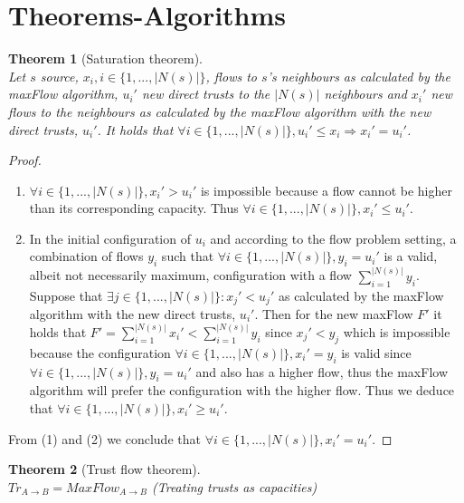 \documentclass[11pt]{article}
\newtheorem{theorem}{Theorem}[section]
\theoremstyle{definition}
\theoremstyle{corollary}
\begin{document}
  \section{Theorems-Algorithms}
    \begin{theorem}[Saturation theorem] \ \\ 
    \label{saturation}
       Let $s$ source, $x_i, i \in \{1,...,|N(s)|\}$, flows to $s$'s neighbours as calculated by the maxFlow algorithm,
       $u_i'$ new direct trusts to the $|N(s)|$ neighbours and $x_i'$ new flows to the neighbours as calculated by the
       maxFlow algorithm with the new direct trusts, $u_i'$. It holds that $\forall i \in \{1,...,|N(s)|\},
       u_i' \leq x_i \Rightarrow x_i' = u_i'$.
    \end{theorem}
    \begin{proof} \ 
       \begin{enumerate}
          \item $\forall i \in \{1,...,|N(s)|\}, x_i' > u_i'$ is impossible because a flow cannot be higher than its
                corresponding capacity. Thus $\forall i \in \{1,...,|N(s)|\}, x_i' \leq u_i'$.
          \item In the initial configuration of $u_i$ and according to the flow problem setting, a combination of flows
                $y_i$ such that $\forall i \in \{1,...,|N(s)|\}, y_i = u_i'$ is a valid, albeit not necessarily maximum,
                configuration with a flow $\sum_{i=1}^{|N(s)|}y_i$. Suppose that $\exists j \in \{1,...,|N(s)|\} : x_j'
                < u_j'$ as calculated by the maxFlow algorithm with the new direct trusts, $u_i'$. Then for the new
                maxFlow $F'$ it holds that $F' = \sum_{i=1}^{|N(s)|}x_i' < \sum_{i=1}^{|N(s)|}y_i$ since $x_j' < y_j$
                which is impossible because the configuration $\forall i \in \{1,...,|N(s)|\}, x_i' = y_i$ is valid since
                $\forall i \in \{1,...,|N(s)|\}, y_i = u_i'$ and also has a higher flow, thus the maxFlow algorithm will
                prefer the configuration with the higher flow. Thus we deduce that $\forall i \in \{1,...,|N(s)|\},
                x_i' \geq u_i'$.
       \end{enumerate}
       From (1) and (2) we conclude that $\forall i \in \{1,...,|N(s)|\}, x_i' = u_i'$.
    \end{proof}
    \begin{theorem}[Trust flow theorem] \ \\
    \label{trustflow}
       $Tr_{A \rightarrow B} = MaxFlow_{A \rightarrow B}$ (Treating trusts as capacities)
    \end{theorem}
\end{document}

